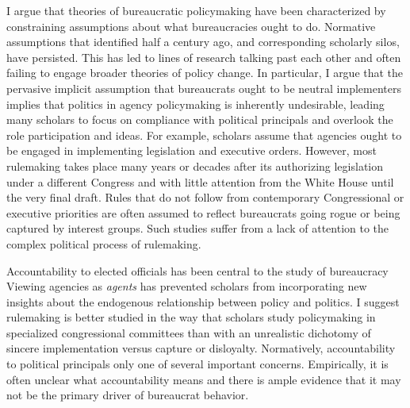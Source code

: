 I argue that theories of bureaucratic policymaking have been characterized by constraining assumptions about what bureaucracies ought to do.  Normative assumptions that \citet{Wilson1967} identified half a century ago, and corresponding scholarly silos, have persisted. This has led to lines of research talking past each other and often failing to engage broader theories of policy change. In particular, I argue that the pervasive implicit assumption that bureaucrats ought to be neutral implementers implies that politics in agency policymaking is inherently undesirable, leading many scholars to focus on compliance with political principals and overlook the role participation and ideas. For example, scholars assume that agencies ought to be engaged in implementing legislation and executive orders. However, most rulemaking takes place many years or decades after its authorizing legislation under a different Congress and with little attention from the White House until the very final draft. Rules that do not follow from contemporary Congressional or executive priorities are often assumed to reflect bureaucrats going rogue or being captured by interest groups. Such studies suffer from a lack of attention to the complex political process of rulemaking. 

Accountability to elected officials has been central to the study of bureaucracy \citep{Epstein1999,Huber2002,McCubbins1984,Wilson1989,Potter2016Slow-RollingRulemaking,Lowande2018PoliticizationAgencies} %
Viewing agencies as \textit{agents} has prevented scholars from incorporating new insights about the endogenous relationship between policy and politics. I suggest rulemaking is better studied in the way that scholars study policymaking in specialized congressional committees than with an unrealistic dichotomy of sincere implementation versus capture or disloyalty. Normatively, accountability to political principals only one of several important concerns. Empirically, it is often unclear what accountability means and there is ample evidence that it may not be the primary driver of bureaucrat behavior.

